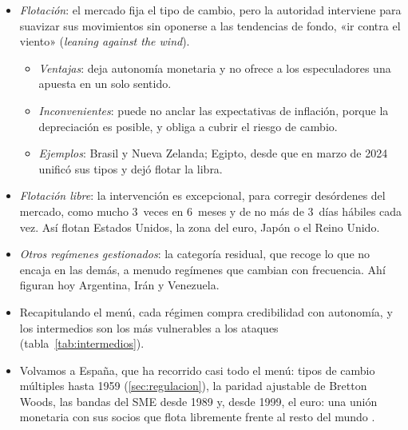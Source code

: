 \documentclass[11pt]{article}
\begin{document}
\begin{itemize}
\item \emph{Flotación}: el mercado fija el tipo de cambio, pero la autoridad interviene para suavizar sus movimientos sin oponerse a las tendencias de fondo, «ir contra el viento» (\emph{leaning against the wind}).
  \begin{itemize}
  \item \emph{Ventajas}: deja autonomía monetaria y no ofrece a los especuladores una apuesta en un solo sentido.
  \item \emph{Inconvenientes}: puede no anclar las expectativas de inflación, porque la depreciación es posible, y obliga a cubrir el riesgo de cambio.
  \item \emph{Ejemplos}: Brasil y Nueva Zelanda; Egipto, desde que en marzo de 2024 unificó sus tipos y dejó flotar la libra\nocite{FMI2026InformeAnual,CBE2024Flotacion}.
  \end{itemize}
\item \emph{Flotación libre}: la intervención es excepcional, para corregir desórdenes del mercado, como mucho 3~veces en 6~meses y de no más de 3~días hábiles cada vez\nocite{HabermeierEtAl2009Revised}. Así flotan Estados Unidos, la zona del euro, Japón o el Reino Unido.
\item \emph{Otros regímenes gestionados}: la categoría residual, que recoge lo que no encaja en las demás, a menudo regímenes que cambian con frecuencia. Ahí figuran hoy Argentina, Irán y Venezuela\nocite{FMI2026InformeAnual}.
\item Recapitulando el menú, cada régimen compra credibilidad con autonomía, y los intermedios son los más vulnerables a los ataques (tabla~\ref{tab:intermedios}).
\item Volvamos a España, que ha recorrido casi todo el menú: tipos de cambio múltiples hasta 1959 (\ref{sec:regulacion}), la paridad ajustable de Bretton Woods, las bandas del SME desde 1989 y, desde 1999, el euro: una unión monetaria con sus socios que flota libremente frente al resto del mundo  .
\end{itemize}
\end{document}
